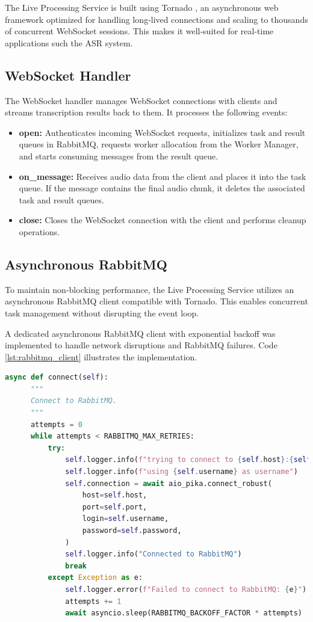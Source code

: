 The Live Processing Service is built using Tornado \cite{tornado}, an asynchronous web framework optimized for handling long-lived connections and scaling to thousands of concurrent WebSocket sessions. This makes it well-suited for real-time applications such the ASR system.

\subsection{WebSocket Handler}
The WebSocket handler manages WebSocket connections with clients and streams transcription results back to them. It processes the following events:

\begin{itemize}
    \item \textbf{open:} Authenticates incoming WebSocket requests, initializes task and result queues in RabbitMQ, requests worker allocation from the Worker Manager, and starts consuming messages from the result queue.
    \item \textbf{on\_message:} Receives audio data from the client and places it into the task queue. If the message contains the final audio chunk, it deletes the associated task and result queues.
    \item \textbf{close:} Closes the WebSocket connection with the client and performs cleanup operations.
\end{itemize}

\subsection{Asynchronous RabbitMQ}
To maintain non-blocking performance, the Live Processing Service utilizes an asynchronous RabbitMQ client compatible with Tornado. This enables concurrent task management without disrupting the event loop.

A dedicated asynchronous RabbitMQ client with exponential backoff was implemented to handle network disruptions and RabbitMQ failures. Code \ref{lst:rabbitmq_client} illustrates the implementation.

\begin{lstlisting}[language=python, caption={Asynchronous RabbitMQ Client}, label={lst:rabbitmq_client}]
async def connect(self):
      """
      Connect to RabbitMQ.
      """
      attempts = 0
      while attempts < RABBITMQ_MAX_RETRIES:
          try:
              self.logger.info(f"trying to connect to {self.host}:{self.port}")
              self.logger.info(f"using {self.username} as username")
              self.connection = await aio_pika.connect_robust(
                  host=self.host,
                  port=self.port,
                  login=self.username,
                  password=self.password,
              )
              self.logger.info("Connected to RabbitMQ")
              break
          except Exception as e:
              self.logger.error(f"Failed to connect to RabbitMQ: {e}")
              attempts += 1
              await asyncio.sleep(RABBITMQ_BACKOFF_FACTOR * attempts)
\end{lstlisting}

